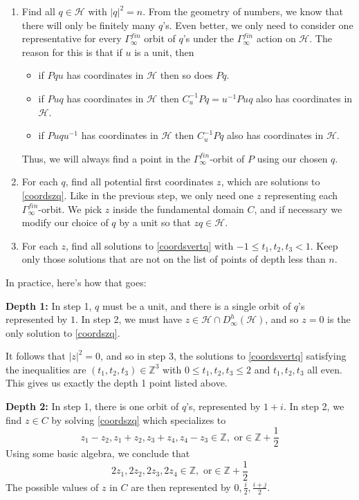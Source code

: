 \documentclass{article}[12pt]
\newcommand{\Z}{\mathbb{Z}}
\begin{document}
\begin{enumerate}
    \item Find all $q\in\mathcal{H}$ with $|q|^2 = n$.  From the geometry of numbers, we know that there will only be finitely many $q$'s.  Even better, we only need to consider one representative for every $\Gamma_\infty^{fin}$ orbit of $q$'s under the $\Gamma_\infty^{fin}$ action on $\mathcal{H}$.  The reason for this is that if $u$ is a unit, then
    \begin{itemize}
        \item if $Pqu$ has coordinates in $\mathcal{H}$ then so does $Pq$.
        \item if $Puq$ has coordinates in $\mathcal{H}$ then $C_u^{-1}Pq = u^{-1}Puq$ also has coordinates in $\mathcal{H}$.
        \item if $Puqu^{-1}$ has coordinates in $\mathcal{H}$ then $C_u^{-1}Pq$ also has coordinates in $\mathcal{H}$.
    \end{itemize}
    Thus, we will always find a point in the $\Gamma_\infty^{fin}$-orbit of $P$ using our chosen $q$.
    
    \item For each $q$, find all potential first coordinates $z$, which are solutions to \eqref{coordszq}.  Like in the previous step, we only need one $z$ representing each $\Gamma_\infty^{fin}$-orbit.  We pick $z$ inside the fundamental domain $C$, and if necessary we modify our choice of $q$ by a unit so that $zq\in\mathcal{H}$.
    
    \item For each $z$, find all solutions to \eqref{coordsvertq} with $-1\leq t_1, t_2, t_3<1$.  Keep only those solutions that are not on the list of points of depth less than $n$.
\end{enumerate}

In practice, here's how that goes:

{\bf Depth 1:} In step 1, $q$ must be a unit, and there is a single orbit of $q$'s represented by $1$.  In step 2, we must have $z\in\mathcal{H}\cap D_\infty^h(\mathcal{H})$, and so $z=0$ is the only solution to \eqref{coordszq}.  

It follows that $|z|^2 = 0$, and so in step 3, the solutions to \eqref{coordsvertq} satisfying the inequalities are $(t_1,t_2,t_3)\in\Z^3$ with $0\leq t_1,t_2,t_3\leq 2$ and $t_1,t_2,t_3$ all even.  This gives us exactly the depth 1 point listed above.

{\bf Depth 2:}  In step 1, there is one orbit of $q$'s, represented by $1+i$.  In step 2, we find $z\in C$ by solving \eqref{coordszq} which specializes to 
$$z_1-z_2, z_1+z_2, z_3+z_4, z_4-z_3 \in \Z, \text{ or}\in\Z+\frac{1}{2}$$
Using some basic algebra, we conclude that 
$$2z_1,2z_2,2z_3,2z_4\in \Z, \text{ or}\in\Z+\frac{1}{2}$$
The possible values of $z$ in $C$ are then represented by $0,\frac{i}{2},\frac{i+j}{2}$.  
\end{document}
